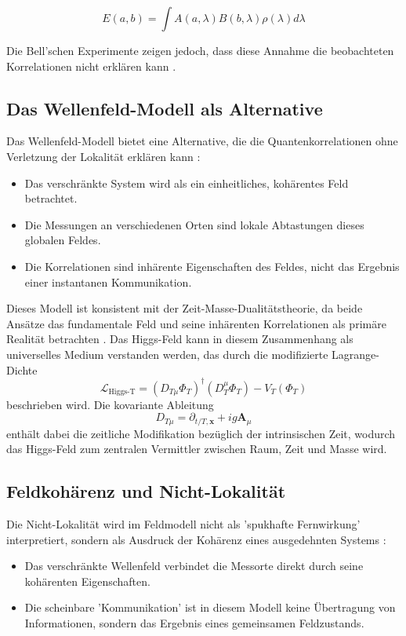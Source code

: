 \documentclass[a4paper,12pt]{article}
\begin{document}
	\begin{equation}
		E(a,b) = \int A(a,\lambda)B(b,\lambda)\rho(\lambda)d\lambda
	\end{equation}
	
	Die Bell'schen Experimente zeigen jedoch, dass diese Annahme die beobachteten Korrelationen nicht erklären kann \cite{Aspect1982}.
	
	\subsection{Das Wellenfeld-Modell als Alternative}
	Das Wellenfeld-Modell bietet eine Alternative, die die Quantenkorrelationen ohne Verletzung der Lokalität erklären kann \cite{Bohm1980}:
	\begin{itemize}
		\item Das verschränkte System wird als ein einheitliches, kohärentes Feld betrachtet.
		\item Die Messungen an verschiedenen Orten sind lokale Abtastungen dieses globalen Feldes.
		\item Die Korrelationen sind inhärente Eigenschaften des Feldes, nicht das Ergebnis einer instantanen Kommunikation.
	\end{itemize}
	
	Dieses Modell ist konsistent mit der Zeit-Masse-Dualitätstheorie, da beide Ansätze das fundamentale Feld und seine inhärenten Korrelationen als primäre Realität betrachten \cite{Pascher2024}. Das Higgs-Feld kann in diesem Zusammenhang als universelles Medium verstanden werden, das durch die modifizierte Lagrange-Dichte
	\begin{equation}
		\mathcal{L}_{\text{Higgs-T}} = (D_{T\mu} \Phi_T)^\dagger (D_T^\mu \Phi_T) - V_T(\Phi_T)
	\end{equation}
	beschrieben wird. Die kovariante Ableitung 
	\begin{equation}
		D_{T\mu} = \partial_{t/T, \mathbf{x}} + ig\mathbf{A}_\mu
	\end{equation}
	enthält dabei die zeitliche Modifikation bezüglich der intrinsischen Zeit, wodurch das Higgs-Feld zum zentralen Vermittler zwischen Raum, Zeit und Masse wird.
	
	\subsection{Feldkohärenz und Nicht-Lokalität}
	Die Nicht-Lokalität wird im Feldmodell nicht als 'spukhafte Fernwirkung' interpretiert, sondern als Ausdruck der Kohärenz eines ausgedehnten Systems \cite{Zeilinger2010}:
	\begin{itemize}
		\item Das verschränkte Wellenfeld verbindet die Messorte direkt durch seine kohärenten Eigenschaften.
		\item Die scheinbare 'Kommunikation' ist in diesem Modell keine Übertragung von Informationen, sondern das Ergebnis eines gemeinsamen Feldzustands.
	\end{itemize}
	
\end{document}

